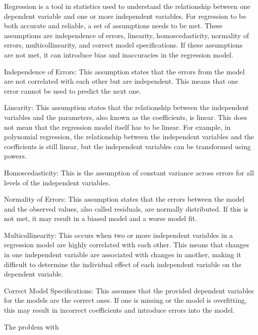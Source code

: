 Regression is a tool in statistics used to understand the relationship between one dependent variable and one or more independent variables. For regression to be both accurate and reliable, a set of assumptions needs to be met. These assumptions are independence of errors, linearity, homoscedasticity, normality of errors, multicollinearity, and correct model specifications. If these assumptions are not met, it can introduce bias and inaccuracies in the regression model.

Independence of Errors: This assumption states that the errors from the model are not correlated with each other but are independent. This means that one error cannot be used to predict the next one.

Linearity: This assumption states that the relationship between the independent variables and the parameters, also known as the coefficients, is linear. This does not mean that the regression model itself has to be linear. For example, in polynomial regression, the relationship between the independent variables and the coefficients is still linear, but the independent variables can be transformed using powers.

Homoscedasticity: This is the assumption of constant variance across errors for all levels of the independent variables.

Normality of Errors: This assumption states that the errors between the model and the observed values, also called residuals, are normally distributed. If this is not met, it may result in a biased model and a worse model fit.

Multicollinearity: This occurs when two or more independent variables in a regression model are highly correlated with each other. This means that changes in one independent variable are associated with changes in another, making it difficult to determine the individual effect of each independent variable on the dependent variable.

Correct Model Specifications: This assumes that the provided dependent variables for the models are the correct ones. If one is missing or the model is overfitting, this may result in incorrect coefficients and introduce errors into the model.

The problem with
